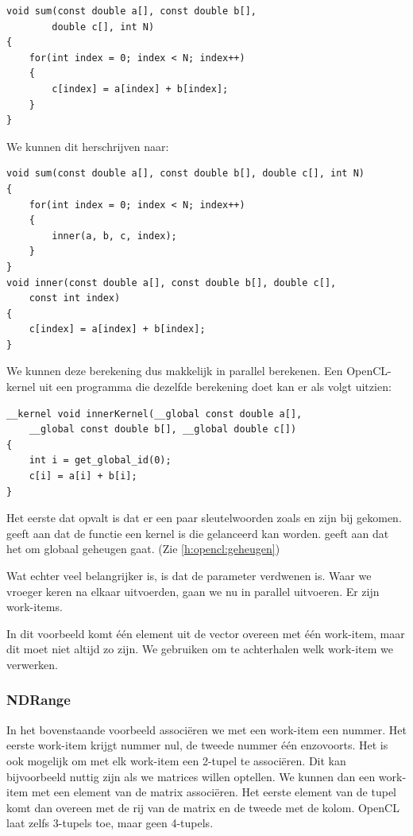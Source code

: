 \begin{lstlisting}
void sum(const double a[], const double b[],
        double c[], int N)
{
    for(int index = 0; index < N; index++)
    {
        c[index] = a[index] + b[index];
    }
}
\end{lstlisting}
We kunnen dit herschrijven naar:
\begin{lstlisting}
void sum(const double a[], const double b[], double c[], int N)
{
    for(int index = 0; index < N; index++)
    {
        inner(a, b, c, index);
    }
}
void inner(const double a[], const double b[], double c[],
    const int index)
{
    c[index] = a[index] + b[index];
}
\end{lstlisting}
We kunnen deze berekening dus makkelijk in parallel berekenen.
Een OpenCL-kernel uit een programma die dezelfde berekening doet kan er als volgt uitzien:
\begin{lstlisting}
__kernel void innerKernel(__global const double a[],
    __global const double b[], __global double c[])
{
    int i = get_global_id(0);
    c[i] = a[i] + b[i];
}
\end{lstlisting}
Het eerste dat opvalt is dat er een paar sleutelwoorden zoals  en  zijn bij gekomen.  geeft aan dat de functie een kernel is die gelanceerd kan worden.  geeft aan dat het om globaal geheugen gaat. (Zie \ref{h:opencl:geheugen})

Wat echter veel belangrijker is, is dat de parameter  verdwenen is. Waar we vroeger   keren na elkaar uitvoerden, gaan we nu  %
in parallel uitvoeren. Er zijn  work-items. 

In dit voorbeeld komt \'e\'en element uit de vector overeen met \'e\'en work-item, maar dit moet niet altijd zo zijn. We gebruiken  om te achterhalen welk work-item we verwerken.

\subsubsection{NDRange}
In het bovenstaande voorbeeld associ\"eren we met een work-item een nummer. Het eerste work-item krijgt nummer nul, de tweede nummer \'e\'en enzovoorts. Het is ook mogelijk om met elk work-item een 2-tupel te associ\"eren. Dit kan bijvoorbeeld nuttig zijn als we matrices willen optellen. We kunnen dan een work-item met een element van de matrix associ\"eren. Het eerste element van de tupel komt dan overeen met de rij van de matrix en de tweede met de kolom. OpenCL laat zelfs 3-tupels toe, maar geen 4-tupels.

